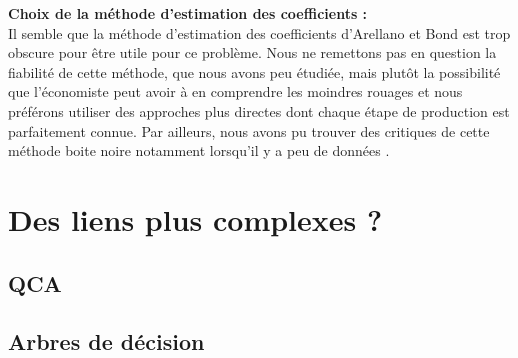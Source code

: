 \documentclass[11pt,a4paper]{article}
\begin{document}
\textbf{Choix de la méthode d'estimation des coefficients :} \\
Il semble que la méthode d'estimation des coefficients d'Arellano et Bond est trop obscure pour être utile pour ce problème. Nous ne remettons pas en question la fiabilité de cette méthode, que nous avons peu étudiée, mais plutôt la possibilité que l'économiste peut avoir à en comprendre les moindres rouages et nous préférons utiliser des approches plus directes dont chaque étape de production est parfaitement connue. 
Par ailleurs, nous avons pu trouver des critiques de cette méthode \og boite noire \fg{} notamment lorsqu'il y a peu de données \cite{roodman}. 



\section{Des liens plus complexes ?}

\subsection{QCA}

\subsection{Arbres de décision}
\end{document}
